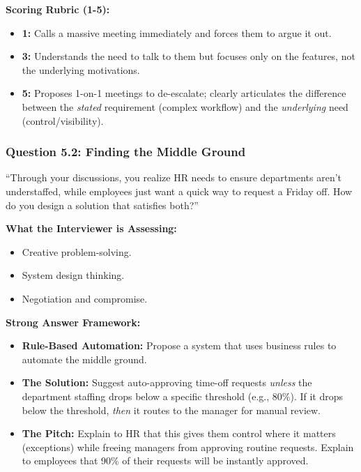 \textbf{Scoring Rubric (1-5):}

\begin{itemize}
\tightlist
\item
  \textbf{1:} Calls a massive meeting immediately and forces them to
  argue it out.
\item
  \textbf{3:} Understands the need to talk to them but focuses only on
  the features, not the underlying motivations.
\item
  \textbf{5:} Proposes 1-on-1 meetings to de-escalate; clearly
  articulates the difference between the \emph{stated} requirement
  (complex workflow) and the \emph{underlying} need
  (control/visibility).
\end{itemize}

\subsubsection{Question 5.2: Finding the Middle
Ground}\label{question-5.2-finding-the-middle-ground}

``Through your discussions, you realize HR needs to ensure departments
aren't understaffed, while employees just want a quick way to request a
Friday off. How do you design a solution that satisfies both?''

\textbf{What the Interviewer is Assessing:}

\begin{itemize}
\tightlist
\item
  Creative problem-solving.
\item
  System design thinking.
\item
  Negotiation and compromise.
\end{itemize}

\textbf{Strong Answer Framework:}

\begin{itemize}
\tightlist
\item
  \textbf{Rule-Based Automation:} Propose a system that uses business
  rules to automate the middle ground.
\item
  \textbf{The Solution:} Suggest auto-approving time-off requests
  \emph{unless} the department staffing drops below a specific threshold
  (e.g., 80\%). If it drops below the threshold, \emph{then} it routes
  to the manager for manual review.
\item
  \textbf{The Pitch:} Explain to HR that this gives them control where
  it matters (exceptions) while freeing managers from approving routine
  requests. Explain to employees that 90\% of their requests will be
  instantly approved.
\end{itemize}

